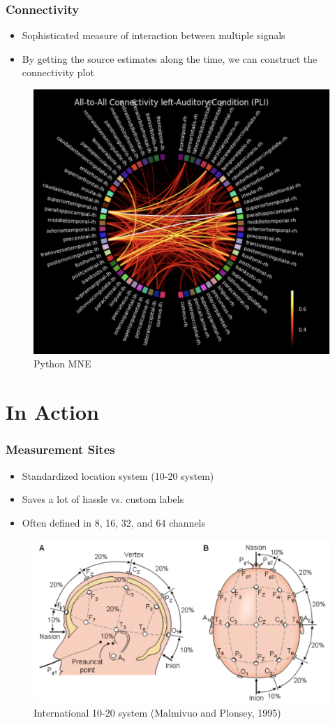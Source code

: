 \documentclass{beamer}
\begin{document}
\begin{frame}
\frametitle{Connectivity}
\begin{itemize}
	\item Sophisticated measure of interaction between multiple signals
	\item By getting the source estimates along the time, we can construct the connectivity plot
\end{itemize}
\begin{figure}
	\includegraphics[width=0.4\linewidth]{image/connectivity2}
	\caption{Python MNE}
\end{figure}
\end{frame}

\section{In Action}

\begin{frame}
\frametitle{Measurement Sites}
\begin{itemize}
	\item Standardized location system (10-20 system)
	\item Saves a lot of hassle vs. custom labels
	\item Often defined in 8, 16, 32, and 64 channels
\end{itemize}
	\begin{figure}
		\includegraphics[width=0.7\linewidth]{image/10-20}
		\caption{International 10-20 system (Malmivuo and Plonsey, 1995)}
	\end{figure}
\end{frame}
\end{document}
